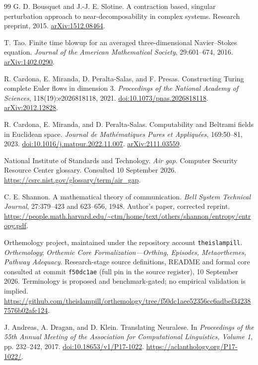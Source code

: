 \documentclass[11pt,a4paper]{article}
\theoremstyle{definition}
\theoremstyle{remark}
\begin{document}
\begin{thebibliography}{99}
G. D. Bousquet and J.-J. E. Slotine. A contraction based, singular perturbation approach to near-decomposability in complex systems. Research preprint, 2015. \href{https://arxiv.org/abs/1512.08464}{arXiv:1512.08464}.

T. Tao. Finite time blowup for an averaged three-dimensional Navier--Stokes equation. \emph{Journal of the American Mathematical Society}, 29:601--674, 2016. \href{https://arxiv.org/abs/1402.0290}{arXiv:1402.0290}.

R. Cardona, E. Miranda, D. Peralta-Salas, and F. Presas. Constructing Turing complete Euler flows in dimension 3. \emph{Proceedings of the National Academy of Sciences}, 118(19):e2026818118, 2021. \href{https://doi.org/10.1073/pnas.2026818118}{doi:10.1073/pnas.2026818118}. \href{https://arxiv.org/abs/2012.12828}{arXiv:2012.12828}.

R. Cardona, E. Miranda, and D. Peralta-Salas. Computability and Beltrami fields in Euclidean space. \emph{Journal de Math\'ematiques Pures et Appliqu\'ees}, 169:50--81, 2023. \href{https://doi.org/10.1016/j.matpur.2022.11.007}{doi:10.1016/j.matpur.2022.11.007}. \href{https://arxiv.org/abs/2111.03559}{arXiv:2111.03559}.

National Institute of Standards and Technology. \emph{Air gap}. Computer Security Resource Center glossary. Consulted 10 September 2026. \url{https://csrc.nist.gov/glossary/term/air_gap}.

C. E. Shannon. A mathematical theory of communication. \emph{Bell System Technical Journal}, 27:379--423 and 623--656, 1948. Author's paper, corrected reprint. \url{https://people.math.harvard.edu/~ctm/home/text/others/shannon/entropy/entropy.pdf}.

Orthemology project, maintained under the repository account \texttt{theislampill}. \emph{Orthemology}; \emph{Orthemic Core Formalization---Orthing, Episodes, Metaorthemes, Pathway Adequacy}. Research-stage source definitions, README and formal core consulted at commit \texttt{f50dc1ae} (full pin in the source register), 10 September 2026. Terminology is proposed and benchmark-gated; no empirical validation is implied. \url{https://github.com/theislampill/orthemology/tree/f50dc1aee52356cc6adbef342387576b02afc124}.

J. Andreas, A. Dragan, and D. Klein. Translating Neuralese. In \emph{Proceedings of the 55th Annual Meeting of the Association for Computational Linguistics, Volume 1}, pp. 232--242, 2017. \href{https://doi.org/10.18653/v1/P17-1022}{doi:10.18653/v1/P17-1022}. \url{https://aclanthology.org/P17-1022/}.


\end{thebibliography}
\end{document}
